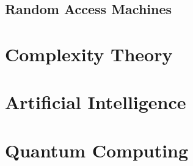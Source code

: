 \subsection{Random Access Machines}



\section{Complexity Theory}




\section{Artificial Intelligence}




\section{Quantum Computing}






\begin{comment}

Programming/Algorithms: 
-Turing completeness, Turing-machine, random-access-machine
 Super turing machines: https://en.wikipedia.org/wiki/Hypercomputation

https://en.wikipedia.org/wiki/Chaitin%

\end{comment}